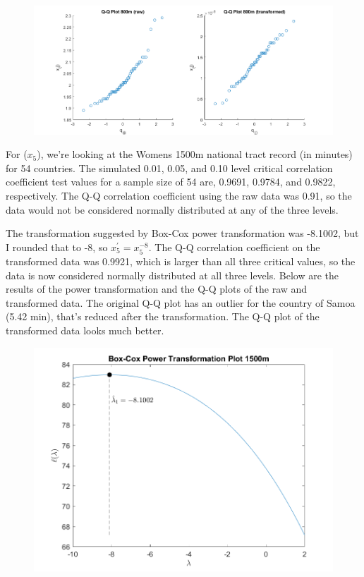 \begin{center}
    \begin{figure}[H]
        \centering
        \includegraphics[scale=0.4]{./matlab/chapter-4/sol4.36.qq.4.png}
    \end{figure}
\end{center}

For ($x_{5}$), we're looking at the Womens 1500m national tract record (in minutes) for 54 countries. The simulated 0.01, 0.05, and 0.10 level critical correlation coefficient test values for a sample size of 54 are, 0.9691, 0.9784, and 0.9822, respectively. The Q-Q correlation coefficient using the raw data was 0.91, so the data would not be considered normally distributed at any of the three levels.

The transformation suggested by Box-Cox power transformation was -8.1002, but I rounded that to -8, so $x_{5}^{\prime} = x_{5}^{-8}$.
The Q-Q correlation coefficient on the transformed data was 0.9921, which is larger than all three critical values, so the data is now considered normally distributed at all three levels.
Below are the results of the power transformation and the Q-Q plots of the raw and transformed data.
The original Q-Q plot has an outlier for the country of Samoa (5.42 min), that's reduced after the transformation. The Q-Q plot of the transformed data looks much better.

\begin{center}
    \begin{figure}[H]
        \centering
        \includegraphics[scale=0.6]{./matlab/chapter-4/sol4.36.power.5.png}
    \end{figure}
\end{center}

